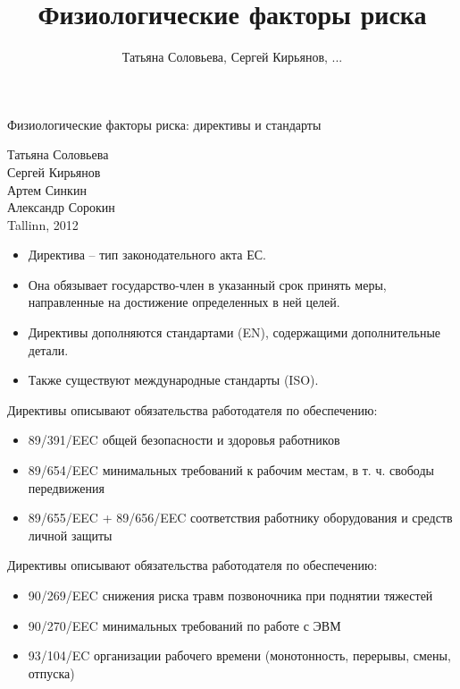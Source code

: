 \documentclass[17pt]{beamer}
\begin{document}
\title{Физиологические факторы риска}
\author{Татьяна Соловьева, Сергей Кирьянов, ...}

\begin{frame}{Физиологические факторы риска: директивы и стандарты}
\begin{center}
    Татьяна Соловьева \\ Сергей Кирьянов \\
    Артем Синкин \\ Александр Сорокин \\
    \vspace{10 mm}
    Tallinn, 2012
\end{center}
\end{frame}

\begin{frame}
\begin{itemize}
\item Директива -- тип законодательного акта ЕС.
\item Она обязывает государство-член в указанный срок принять меры, 
направленные на достижение определенных в ней целей.
\item Директивы дополняются стандартами (EN), содержащими дополнительные детали.
\item Также существуют международные стандарты (ISO).
\end{itemize}
\end{frame}

\begin{frame}
Директивы описывают обязательства работодателя по обеспечению:
\begin{itemize}
\item 89/391/EEC общей безопасности и здоровья работников
\item 89/654/EEC минимальных требований к рабочим местам, в т. ч. свободы передвижения
\item 89/655/EEC + 89/656/EEC 
соответствия работнику оборудования и средств личной защиты 
\end{itemize}
\end{frame}

\begin{frame}
Директивы описывают обязательства работодателя по обеспечению:
\begin{itemize}
\item 90/269/EEC снижения риска травм позвоночника при поднятии тяжестей
\item 90/270/EEC минимальных требований по работе с ЭВМ
\item 93/104/EC организации рабочего времени (монотонность, перерывы, смены, отпуска)
\end{itemize}
\end{frame}
\end{document}
